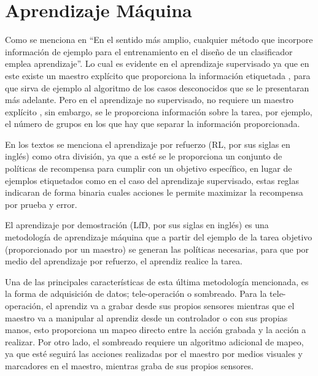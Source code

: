 \section{Aprendizaje M\'aquina}

Como se menciona en \cite{9780471056690} ``En el sentido m\'as amplio,
 cualquier m\'etodo que incorpore informaci\'on de ejemplo para el 
 entrenamiento en el dise\~no de un clasificador emplea aprendizaje''.
 Lo cual es evidente en el aprendizaje supervisado ya que en este existe 
 un maestro expl\'icito que proporciona la informaci\'on etiquetada
 \cite{9780471056690}, para que sirva de ejemplo al algoritmo de los casos 
 desconocidos que se le presentaran m\'as adelante. Pero en el aprendizaje 
 no supervisado, no requiere un maestro expl\'icito \cite{9780471056690}, sin 
 embargo, se le proporciona informaci\'on sobre la tarea, por ejemplo, el 
 n\'umero de grupos en los que hay que separar la informaci\'on proporcionada.


En los textos \cite{9780471056690, 9780387310732} se menciona el aprendizaje 
 por refuerzo (RL, por sus siglas en ingl\'es) como otra divisi\'on, ya que 
 a est\'e se le proporciona un conjunto de pol\'iticas de recompensa para 
 cumplir con un objetivo espec\'ifico, en lugar de ejemplos etiquetados como 
 en el caso del aprendizaje supervisado, estas reglas indicaran de forma 
 binaria cuales acciones le permite maximizar la recompensa por prueba y error.


El aprendizaje por demostraci\'on (LfD, por sus siglas en ingl\'es)
 \cite{ARGALL2009469} es una metodolog\'ia de aprendizaje m\'aquina que a 
 partir del ejemplo de la tarea objetivo (proporcionado por un maestro) 
 se generan las pol\'iticas necesarias, para que por medio del aprendizaje 
 por refuerzo, el aprendiz realice la tarea.


Una de las principales caracter\'isticas de esta \'ultima metodolog\'ia
 mencionada, es la forma de adquisici\'on de datos; tele-operaci\'on o 
 sombreado. Para la tele-operaci\'on\cite{ARGALL2009469}, el aprendiz va 
 a grabar desde sus propios sensores mientras que el maestro va a manipular 
 al aprendiz desde un controlador o con sus propias manos, esto proporciona 
 un mapeo directo entre la acci\'on grabada y la acci\'on a realizar. Por 
 otro lado, el sombreado\cite{ARGALL2009469} requiere un algoritmo adicional 
 de mapeo, ya que est\'e seguir\'a las acciones realizadas por el maestro por 
 medios visuales y marcadores en el maestro, mientras graba de sus propios 
 sensores. 


